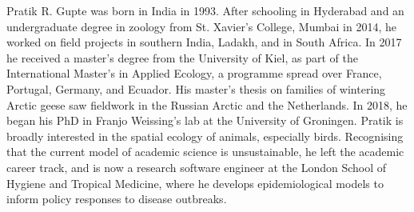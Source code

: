 \label{ch:pubs}

\begingroup

Pratik R. Gupte was born in India in 1993.
After schooling in Hyderabad and an undergraduate degree in zoology from St. Xavier's College, Mumbai in 2014, he worked on field projects in southern India, Ladakh, and in South Africa.
In 2017 he received a master's degree from the University of Kiel, as part of the International Master's in Applied Ecology, a programme spread over France, Portugal, Germany, and Ecuador.
His master's thesis on families of wintering Arctic geese saw fieldwork in the Russian Arctic and the Netherlands.
In 2018, he began his PhD in Franjo Weissing's lab at the University of Groningen.
Pratik is broadly interested in the spatial ecology of animals, especially birds.
Recognising that the current model of academic science is unsustainable, he left the academic career track, and is now a research software engineer at the London School of Hygiene and Tropical Medicine, where he develops epidemiological models to inform policy responses to disease outbreaks.

\let\clearpage\relax
\let\cleardoublepage\relax
\let\cleardoublepage\relax


\begin{refsection}
    \small
    \nocite{gupte2021a,gupte2022c,gupte2022d,thaker2019,nathan2022,netz2022,ramesh2022,
        bijleveld2021,rimbach2022un,gupte2019} %
    \printbibliography[title=Author Publications]
\end{refsection}

\begin{refsection}
    \small
    \nocite{gupte2022,gupte2022e,gupte2022b,gupte2021b,gupte2020a,gupte2022f,netz2021b,netz2022a,netz2021b} %
    \printbibliography[title=Data and Code]
\end{refsection}

\endgroup

{ \begin{center}  \end{center} }

